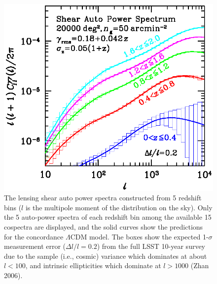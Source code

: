 \documentclass{emulateapj}
\begin{document}
\begin{figure}
\includegraphics[width=1.0\hsize,clip]{cls.ps}
\caption{The lensing shear auto power spectra constructed from 5 redshift bins 
($l$ is the multipole moment of the distribution on the sky). Only the 5 auto-power 
spectra of each redshift bin among the available 15 cospectra are displayed, and the 
solid curves show the predictions for the concordance $\Lambda$CDM model. The boxes 
show the expected 1-$\sigma$ measurement error ($\Delta l/l=0.2$) from the full LSST 
10-year survey due to the sample (i.e., cosmic) variance which dominates at about 
$l< 100$, and intrinsic ellipticities which dominate at $l> 1000$ (Zhan 2006).} 
\label{Fig:wlPk}
\end{figure}
\end{document}
